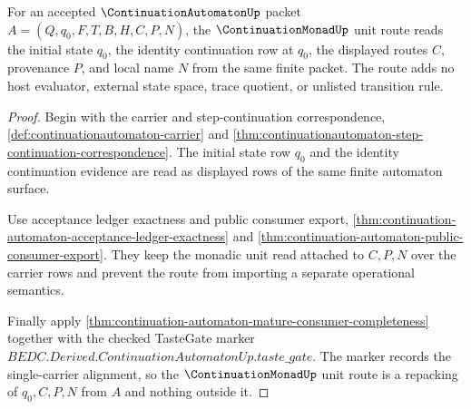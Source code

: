 \begin{theorem}
\label{thm:continuation-automaton-continuationmonad-unit-route}
For an accepted $\ContinuationAutomatonUp$ packet $A=(Q,q_0,F,T,B,H,C,P,N)$, the $\ContinuationMonadUp$ unit route reads the initial state $q_0$, the identity continuation row at $q_0$, the displayed routes $C$, provenance $P$, and local name $N$ from the same finite packet. The route adds no host evaluator, external state space, trace quotient, or unlisted transition rule.
\end{theorem}
\begin{proof}
Begin with the carrier and step-continuation correspondence, \autoref{def:continuationautomaton-carrier} and \autoref{thm:continuationautomaton-step-continuation-correspondence}. The initial state row $q_0$ and the identity continuation evidence are read as displayed rows of the same finite automaton surface.

Use acceptance ledger exactness and public consumer export, \autoref{thm:continuation-automaton-acceptance-ledger-exactness} and \autoref{thm:continuation-automaton-public-consumer-export}. They keep the monadic unit read attached to $C,P,N$ over the carrier rows and prevent the route from importing a separate operational semantics.

Finally apply \autoref{thm:continuation-automaton-mature-consumer-completeness} together with the checked TasteGate marker $BEDC.Derived.ContinuationAutomatonUp.taste\_gate$. The marker records the single-carrier alignment, so the $\ContinuationMonadUp$ unit route is a repacking of $q_0,C,P,N$ from $A$ and nothing outside it.
\end{proof}

